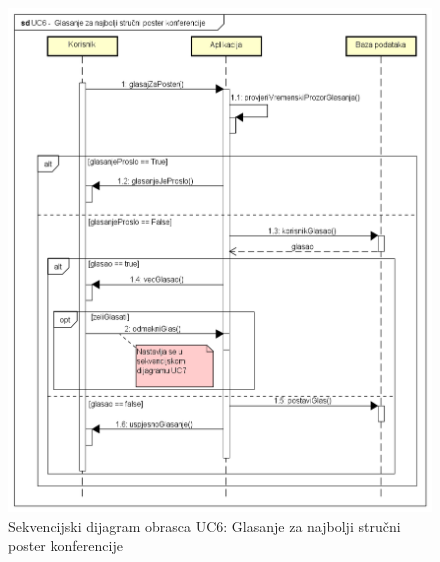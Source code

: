 				\begin{figure}[H]
					\includegraphics[width=\textwidth]{slike/uc6Sekvencijski.PNG} %
					\caption{Sekvencijski dijagram obrasca UC6: Glasanje za najbolji stručni poster konferencije}
					\label{fig:uc6-sekvencijski} %
				\end{figure}
